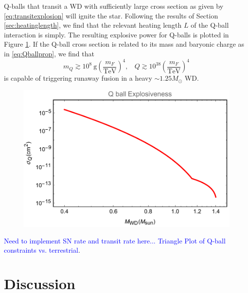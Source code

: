\documentclass[twocolumn,showpacs,preprintnumbers,amsmath,amssymb,prd]{revtex4}
\def\r{\right)}
\def\l{\left(}
\begin{document}
Q-balls that transit a WD with sufficiently large cross section as given by \eqref{eq:transitexplosion} will ignite the star. Following the results of Section \ref{sec:heatinglength}, we find that the relevant heating length $L$ of the Q-ball interaction is simply. The resulting explosive power for Q-balls is plotted in Figure \ref{fig:boomQball}. If the Q-ball cross section is related to its mass and baryonic charge as in \eqref{eq:Qballprop}, we find that
\begin{equation}
m_Q \gtrsim 10^8 ~\text{g} \l\frac{m_F}{\text{TeV}}\r^4, ~~~~ Q \gtrsim 10^{38} \l\frac{m_F}{\text{TeV}}\r^4
\end{equation}
is capable of triggering runaway fusion in a heavy $\sim 1.25 M_{\odot}$ WD.

\begin{figure}
\label{fig:boomQball}
\includegraphics[scale=.45]{boomQball.pdf}
\end{figure}

\textcolor{blue}{Need to implement SN rate and transit rate here...} \textcolor{blue}{Triangle Plot of Q-ball constraints vs. terrestrial}.

\section{Discussion}
\label{sec:discussion}
\end{document}
